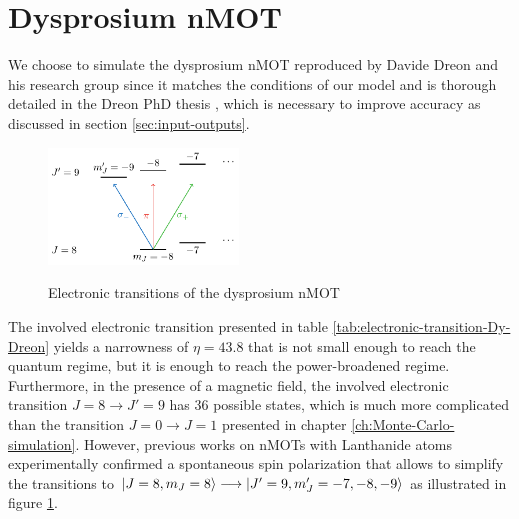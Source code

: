 %
\section{Dysprosium nMOT}
\label{sec:dysprosium-nMOT}
%

We choose to simulate the dysprosium nMOT \cite{dreon2017optical} reproduced by Davide Dreon and his research group since it matches the conditions of our model and is thorough detailed in the Dreon PhD thesis \cite{dreon2017designing}, which is necessary to improve accuracy as discussed in section \ref{sec:input-outputs}.

\begin{figure}
    \centering
    \caption{Electronic transitions of the dysprosium nMOT}
    \includegraphics[width=0.45\textwidth]{USPSC-img/Dy-Dreon-transitions.png}
    \vspace{5px}
    \label{fig:Dy-Dreon-electronic-transitions}
\end{figure}
The involved electronic transition presented in table \ref{tab:electronic-transition-Dy-Dreon} yields a narrowness of $ \eta =  43.8 $ that is not small enough to reach the quantum regime, but it is enough to reach the power-broadened regime. Furthermore, in the presence of a magnetic field, the involved electronic transition $ J = 8 \longrightarrow J' = 9 $ has 36 possible states, which is much more complicated than the transition $ J = 0 \longrightarrow J = 1 $ presented in chapter \ref{ch:Monte-Carlo-simulation}. However, previous works \cite{lu2011strongly,aikawa2012bose} on nMOTs with Lanthanide atoms experimentally confirmed a spontaneous spin polarization that allows to simplify the transitions to $ \ket{J = 8, m_J = 8} \longrightarrow \ket{J' = 9, m_J' = -7, -8, -9} $ as  illustrated in figure \ref{fig:Dy-Dreon-electronic-transitions}.

